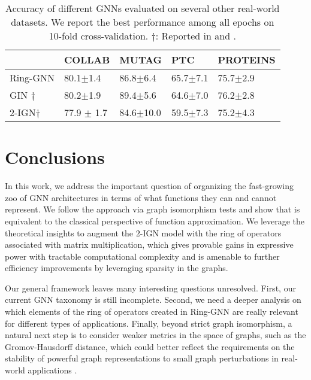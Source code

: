 \documentclass{article}
\begin{document}
\begin{table}[ht]
\centering
\begin{tabular}{l|l|l|l|l}
\hline
            & COLLAB & MUTAG & PTC   & PROTEINS \\ \hline
Ring-GNN     & 80.1$\pm$1.4   & 86.8$\pm$6.4  & 65.7$\pm$7.1  & 75.7$\pm$2.9     \\ \hline
GIN $\dagger$          & 80.2$\pm$1.9   & 89.4$\pm$5.6  & 64.6$\pm$7.0  & 76.2$\pm$2.8     \\ \hline
$2$-IGN$\dagger$  & 77.9 $\pm$ 1.7  & 84.6$\pm$10.0 & 59.5$\pm$7.3 & 75.2$\pm$4.3   \\ \hline
\end{tabular}
\vspace{5pt}
\caption{Accuracy of different GNNs evaluated on several other real-world datasets.  We report the best performance among all epochs on 10-fold cross-validation. $\dagger$: Reported in \cite{xu2018powerful} and \cite{maron2018invariant}. }
\label{tab.other}
\end{table}

\section{Conclusions}
In this work, we address the important question of organizing the fast-growing zoo 
of GNN architectures in terms of what functions they can and cannot represent. 
We follow the approach via graph isomorphism tests and show that is equivalent 
to the classical perspective of function approximation. 
We leverage the theoretical insights to augment the $2$-IGN model
with the ring of operators associated with matrix multiplication, which gives provable gains in expressive power with tractable computational complexity and is amenable to further efficiency improvements by leveraging sparsity in the graphs. 

Our general framework leaves many interesting questions unresolved. First, our current GNN taxonomy is still incomplete. Second, we need a deeper analysis on which elements of the ring of operators created in Ring-GNN are really relevant for different types of applications.
Finally, beyond strict graph isomorphism, a natural next step is to consider weaker metrics in the space of graphs, such as the Gromov-Hausdorff distance,
which could better reflect the requirements on the stability of powerful graph representations to small graph perturbations in real-world applications \cite{gama2019stability}. 
\end{document}
